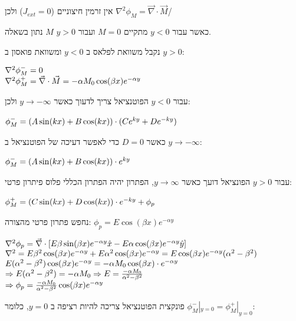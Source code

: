 \documentclass[14pt]{extarticle}
\makeatletter
\newenvironment{lefteqs}{%
    \begin{english}%
    \begin{flushleft}%
    \renewcommand{\arraystretch}{1.3}%
    $\begin{array}{@{}l@{}}%
}{%
    \end{array}$%
    \end{flushleft}%
    \end{english}%
}
\makeatother
\begin{document}
אין זרמין חיצוניים ($J_{ext}=0$) ולכן $\nabla^2 \phi_M = \vec{\nabla} \cdot \vec{M}$/

כאשר עבור $y<0$ מתקיים $M=0$ ועבור $y>0$ $M$ נתון בשאלה.

נקבל משוואת לפלאס ב $y<0$ ומשוואת פואסון ב $y>0$:

\begin{lefteqs}
    \nabla^2 \phi_M^- = 0 \\
    \nabla^2 \phi_M^+ = \vec{\nabla} \cdot \vec{M} = -\alpha M_0 \cos(\beta x) e^{-\alpha y}
\end{lefteqs}

עבור $y<0$ הפוטנציאל צריך לדעוך כאשר $y \to -\infty$ ולכן:
\begin{lefteqs}
    \phi_M^- = (A\sin(kx) + B\cos(kx)) \cdot (Ce^{ky} + De^{-ky}) \\
\end{lefteqs}

כאשר $D=0$ כדי לאפשר דעיכה של הפוטנציאל ב $y \to -\infty$:
\begin{lefteqs}
    \phi_M^- = (A\sin(kx) + B\cos(kx)) \cdot e^{ky}
\end{lefteqs}

עבור $y>0$ הפונציאל דועך כאשר $y \to \infty$, הפתרון יהיה הפתרון הכללי פלוס פיתרון פרטי:

\begin{lefteqs}
    \phi_M^+ = (C\sin(kx) + D\cos(kx)) \cdot e^ {-ky} + \phi_p
\end{lefteqs}

נחפש פתרון פרטי מהצורה: $\phi_p = E \cos(\beta x) e^{-\alpha y}$

\begin{lefteqs}
    \nabla^2 \phi_p = \vec{\nabla} \cdot \left[ E \beta \sin(\beta x)e^{-\alpha y}\hat{x} - E \alpha \cos(\beta x) e^{-\alpha y} \hat{y} \right] \\
    \nabla^2 = E \beta^2 \cos(\beta x)e^{-\alpha y} + E\alpha^2\cos(\beta x)e^{-\alpha y} = E\cos(\beta x)e^{-\alpha y}(\alpha^2 - \beta^2) \\
    E(\alpha^2 - \beta^2)\cos(\beta x)e^{-\alpha y} = -\alpha M_0 \cos(\beta x) \cdot e^{-\alpha y} \\
    \Rightarrow E(\alpha^2 - \beta^2) = -\alpha M_0 \Rightarrow E = \frac{-\alpha M_0}{\alpha^2 - \beta^2} \\
    \Rightarrow \phi_p = \frac{-\alpha M_0}{\alpha^2 - \beta^2} \cos(\beta x) e^{-\alpha y}
\end{lefteqs}

פונקצית הפוטנציאל צריכה להיות רציפה ב $y=0$, כלומר $\phi_M^-|_{y=0} = \phi_M^+|_{y=0}$:
\end{document}
